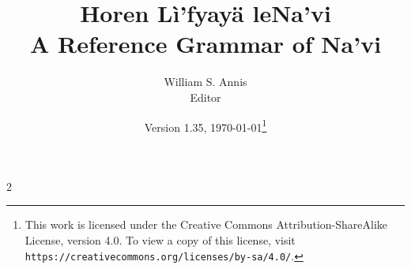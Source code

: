 \documentclass[12pt,oneside]{book}
\begin{document}
\frenchspacing

\title{Horen Lì'fyayä leNa'vi\\A Reference Grammar of Na'vi}
\author{William S. Annis\\Editor}
\date{Version 1.35, \today\footnote{This work is licensed
    under the Creative Commons Attribution-ShareAlike License, version
    4.0.  To view a copy of this license, visit 
    \texttt{https://creativecommons.org/licenses/by-sa/4.0/}.}}
\maketitle

\setcounter{tocdepth}{2}
\begin{multicols}{2}
\tableofcontents
\end{multicols}










\appendix
{\small \printindex}
\end{document}
